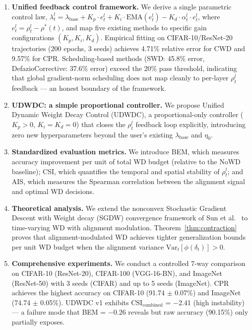 \documentclass{article}
\begin{document}
\begin{enumerate}
\item \textbf{Unified feedback control framework.} We derive a single parametric control law, $\lambda_t^l = \lambda_{\text{base}} + K_p \cdot e_t^l + K_i \cdot \text{EMA}(e_t^l) - K_d \cdot \alpha_t^l \cdot e_t^l$, where $e_t^l = \rho_t^l - \rho^*(t)$, and map five existing methods to specific gain configurations $(K_p, K_i, K_d)$. Empirical fitting on CIFAR-10/ResNet-20 trajectories (200 epochs, 3 seeds) achieves 4.71\% relative error for CWD and 9.57\% for CPR. Scheduling-based methods (SWD: 45.8\% error, DefazioCorrective: 37.6\% error) exceed the 20\% pass threshold, indicating that global gradient-norm scheduling does not map cleanly to per-layer $\rho_t^l$ feedback --- an honest boundary of the framework.

\item \textbf{UDWDC: a simple proportional controller.} We propose Unified Dynamic Weight Decay Control (UDWDC), a proportional-only controller ($K_p > 0$, $K_i = K_d = 0$) that closes the $\rho_t^l$ feedback loop explicitly, introducing zero new hyperparameters beyond the user's existing $\lambda_{\text{base}}$ and $\eta_0$.

\item \textbf{Standardized evaluation metrics.} We introduce BEM, which measures accuracy improvement per unit of total WD budget (relative to the NoWD baseline); CSI, which quantifies the temporal and spatial stability of $\rho_t^l$; and AIS, which measures the Spearman correlation between the alignment signal and optimal WD decisions.

\item \textbf{Theoretical analysis.} We extend the nonconvex Stochastic Gradient Descent with Weight decay (SGDW) convergence framework of Sun et al.~\citep{sun2025convergence} to time-varying WD with alignment modulation. Theorem~\ref{thm:contraction} proves that alignment-modulated WD achieves tighter generalization bounds per unit WD budget when the alignment variance $\text{Var}_t[\phi(\delta_t)] > 0$.

\item \textbf{Comprehensive experiments.} We conduct a controlled 7-way comparison on CIFAR-10 (ResNet-20), CIFAR-100 (VGG-16-BN), and ImageNet (ResNet-50) with 3 seeds (CIFAR) and up to 5 seeds (ImageNet). CPR achieves the highest accuracy on CIFAR-10 (91.74 $\pm$ 0.07\%) and ImageNet (74.74 $\pm$ 0.05\%). UDWDC v1 exhibits $\text{CSI}_\text{combined}$ = $-$2.41 (high instability) --- a failure mode that BEM = $-$0.26 reveals but raw accuracy (90.15\%) only partially exposes.
\end{enumerate}
\end{document}
